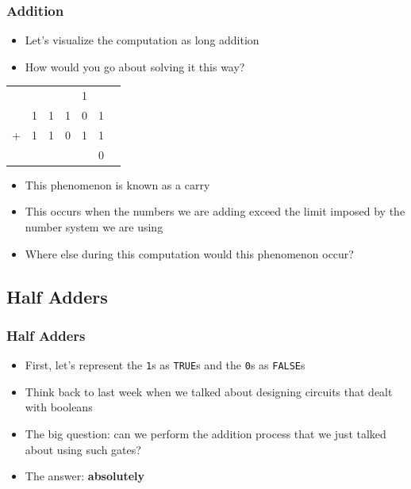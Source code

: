 \documentclass{beamer}
\begin{document}
		\begin{frame}
    		\frametitle{Addition}
    		\begin{itemize}
    			\item Let's visualize the computation as long addition
    			\item How would you go about solving it this way?
			\end{itemize}
			
			\centering
			{\LARGE
			\begin{tabular}{c@{\,}c@{\,}c@{\,}c@{\,}c@{\,}c@{\,}c}
					   &   &   &   & {\color{red}1} &   \\
					   & 1 & 1 & 1 & 0 & 1 \\
					 + & 1 & 1 & 0 & 1 & 1 \\
					\hline
					   &   &   &   &   & 0
					
			\end{tabular}}
			
			\begin{itemize}
				\item This phenomenon is known as a {\color{red}carry}
				\item This occurs when the numbers we are adding exceed the limit imposed by the number system we are using
				\item Where else during this computation would this phenomenon occur?
			\end{itemize}
		\end{frame}	
		
		\subsection{Half Adders}
		
		\begin{frame}
			\frametitle{Half Adders}
			\begin{itemize}
				\item First, let's represent the \texttt{1}s as \texttt{TRUE}s and the \texttt{0}s as \texttt{FALSE}s
				\item Think back to last week when we talked about designing circuits that dealt with booleans
				\item The big question: can we perform the addition process that we just talked about using such gates?
				\item The answer: \textbf{absolutely}
			\end{itemize}
		\end{frame}
		
\end{document}
